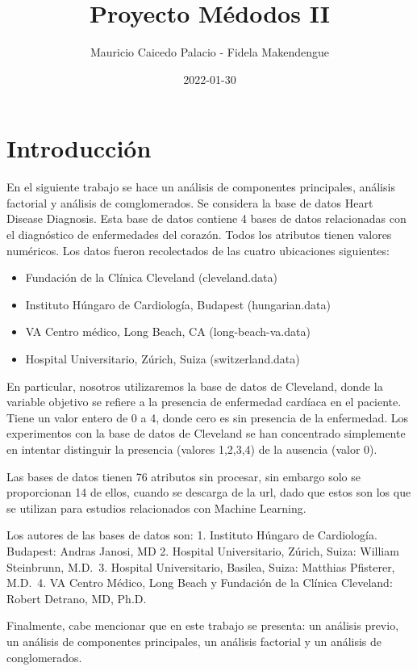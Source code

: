 \documentclass[
]{article}
\title{Proyecto Médodos II}
\author{Mauricio Caicedo Palacio - Fidela Makendengue}
\date{2022-01-30}
\begin{document}
\maketitle

\hypertarget{introducciuxf3n}{%
\section{Introducción}\label{introducciuxf3n}}

En el siguiente trabajo se hace un análisis de componentes principales,
análisis factorial y análisis de comglomerados. Se considera la base de
datos Heart Disease Diagnosis. Esta base de datos contiene 4 bases de
datos relacionadas con el diagnóstico de enfermedades del corazón. Todos
los atributos tienen valores numéricos. Los datos fueron recolectados de
las cuatro ubicaciones siguientes:

\begin{itemize}
\item
  Fundación de la Clínica Cleveland (cleveland.data)
\item
  Instituto Húngaro de Cardiología, Budapest (hungarian.data)
\item
  VA Centro médico, Long Beach, CA (long-beach-va.data)
\item
  Hospital Universitario, Zúrich, Suiza (switzerland.data)
\end{itemize}

En particular, nosotros utilizaremos la base de datos de Cleveland,
donde la variable objetivo se refiere a la presencia de enfermedad
cardíaca en el paciente. Tiene un valor entero de 0 a 4, donde cero es
sin presencia de la enfermedad. Los experimentos con la base de datos de
Cleveland se han concentrado simplemente en intentar distinguir la
presencia (valores 1,2,3,4) de la ausencia (valor 0).

Las bases de datos tienen 76 atributos sin procesar, sin embargo solo se
proporcionan 14 de ellos, cuando se descarga de la url, dado que estos
son los que se utilizan para estudios relacionados con Machine Learning.

Los autores de las bases de datos son: 1. Instituto Húngaro de
Cardiología. Budapest: Andras Janosi, MD 2. Hospital Universitario,
Zúrich, Suiza: William Steinbrunn, M.D.~3. Hospital Universitario,
Basilea, Suiza: Matthias Pfisterer, M.D.~4. VA Centro Médico, Long Beach
y Fundación de la Clínica Cleveland: Robert Detrano, MD, Ph.D.

Finalmente, cabe mencionar que en este trabajo se presenta: un análisis
previo, un análisis de componentes principales, un análisis factorial y
un análisis de conglomerados.
\end{document}
